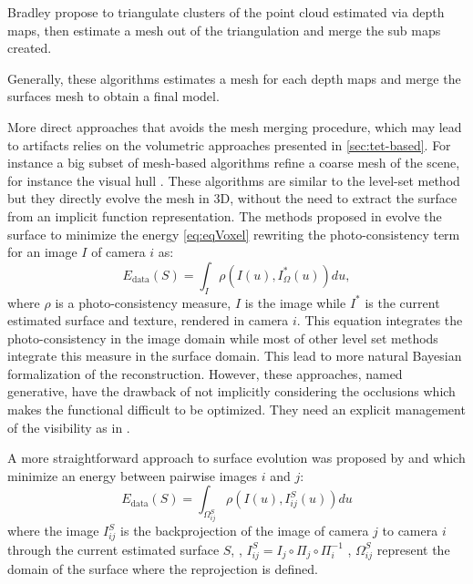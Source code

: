 Bradley \etal \cite{bradley2008accurate} propose to triangulate clusters of the point cloud estimated via depth maps, then estimate a mesh out of the triangulation and merge the sub maps created.

Generally, these algorithms estimates a mesh for each depth maps and merge the surfaces mesh to obtain a final model.

More direct approaches that avoids the mesh merging procedure, which may lead to artifacts relies on the volumetric approaches presented in \ref{sec:tet-based}.
For instance a big subset of mesh-based algorithms refine a coarse mesh of the scene, for instance the visual hull \cite{hiep2009towards,zaharescu2007transformesh,delaunoy_et_al_08,gargallo2007minimizing,delaunoy2011gradient,vu2011large}. These algorithms are similar to the level-set method but they directly evolve the mesh in 3D, without the need to extract the surface from an implicit function representation.
The methods proposed in \cite{delaunoy_et_al_08,gargallo2007minimizing,delaunoy2011gradient} evolve the surface to minimize the energy \eqref{eq:eqVoxel} rewriting the photo-consistency term for an image $I$ of camera $i$ as:
\begin{equation}
\label{eq:generative}
  E_{\text{data}}(S) = \int_{\mathit{I}} \rho\left(I(\mathit{u}), I^*_{\Omega}(\mathit{u})\right) d\mathit{u},
\end{equation}
where $\rho$ is a photo-consistency measure, $I$ is the image while $I^*$ is the current estimated surface and texture, rendered in camera $i$.
This equation integrates the photo-consistency in the image domain while most of other level set methods integrate this measure in the surface domain. This lead to more natural Bayesian formalization of the reconstruction. 
However, these approaches, named generative, have the drawback of not implicitly considering the occlusions which makes the functional difficult to be optimized. They need an explicit management of the visibility as in \cite{delaunoy2011gradient}.

A more straightforward approach to surface evolution was proposed by \cite{hiep2009towards} and \cite{vu2011large} which minimize an energy between pairwise images $i$ and $j$:
\begin{equation}
\label{eq:nongen}
  E_{\text{data}}(S) = \int_{\Omega^{\mathit{S}}_{ij}} \rho\left(I(\mathit{u}), I^{\mathit{S}}_{ij}(\mathit{u})\right) d\mathit{u}
\end{equation}
where the image $I^{\mathit{S}}_{ij}$ is the backprojection of the image of camera $j$ to camera $i$ through the current estimated surface $\mathit{S}$, \ie, $I^{\mathit{S}}_{ij} = I_j \circ \Pi_j \circ \Pi_i^{-1}$ , $\Omega^{\mathit{S}}_{ij}$ represent the domain of the surface where the reprojection is defined.

